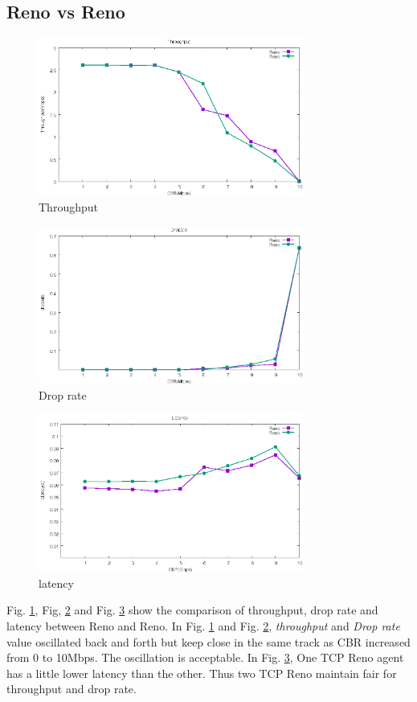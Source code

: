 \documentclass[10pt, conference]{IEEEtran}
\begin{document}
	\subsection{Reno vs Reno}
	\begin{figure}[H]
		\centering
		\includegraphics[width=3.45in]{imgs/exp2_tp_Reno_Reno.eps}
		\caption[Optional caption]{Throughput}
		\label{fig:8}
	\end{figure}
	\begin{figure}[H]
		\centering
		\includegraphics[width=3.45in]{imgs/exp2_dr_Reno_Reno.eps}
		\caption[Optional caption]{Drop rate}
		\label{fig:9}
	\end{figure}
	\begin{figure}[H]
		\centering
		\includegraphics[width=3.45in]{imgs/exp2_la_Reno_Reno.eps}
		\caption[Optional caption]{latency}
		\label{fig:10}
	\end{figure}
	Fig. \ref{fig:8}, Fig, \ref{fig:9} and Fig. \ref{fig:10} show the comparison of throughput, drop rate and latency between Reno and Reno. In Fig. \ref{fig:8} and Fig. \ref{fig:9}, \textit{throughput} and \textit{Drop rate} value oscillated back and forth but keep close in the same track as CBR increased from 0 to 10Mbps. The oscillation is acceptable. In Fig. \ref{fig:10}, One TCP Reno agent has a little lower latency than the other. Thus two TCP Reno maintain fair for throughput and drop rate.
	
\end{document}
